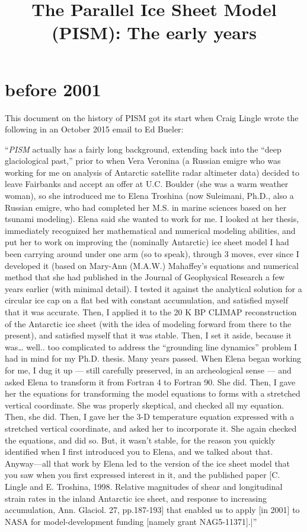 \documentclass[11pt]{article}
\begin{document}
\title{The Parallel Ice Sheet Model (PISM): The early years}
\maketitle

\section*{before 2001}

This document on the history of PISM got its start when Craig Lingle wrote the following in an October 2015 email to Ed Bueler:

``\emph{PISM} actually has a fairly long background, extending back into the “deep glaciological past,” prior to when Vera Veronina (a Russian emigre who was working for me on analysis of Antarctic satellite radar altimeter data) decided to leave Fairbanks and accept an offer at U.C. Boulder (she was a warm weather woman), so she introduced me to Elena Troshina (now Suleimani, Ph.D., also a Russian emigre, who had completed her M.S. in marine sciences based on her tsunami modeling). Elena said she wanted to work for me.
I looked at her thesis, immediately recognized her mathematical and numerical modeling abilities, and put her to work on improving the (nominally Antarctic) ice sheet model I had been carrying around under one arm (so to speak), through 3 moves, ever since I developed it (based on Mary-Ann (M.A.W.) Mahaffey’s equations and numerical method that she had published in the Journal of Geophysical Research a few years earlier (with minimal detail). I tested it against the analytical solution for a circular ice cap on a flat bed with constant accumulation, and satisfied myself that it was accurate. Then, I applied it to the 20 K BP CLIMAP reconstruction of the Antarctic ice sheet (with the idea of modeling forward from there to the present), and satisfied myself that it was stable. Then, I set it aside, because it was… well.. too complicated to address the “grounding line dynamics” problem I had in mind for my Ph.D. thesis.
Many years passed. When Elena began working for me, I dug it up — still carefully preserved, in an archeological sense — and asked Elena to transform it from Fortran 4 to Fortran 90. She did. Then, I gave her the equations for transforming the model equations to forms with a stretched vertical coordinate. She was properly skeptical, and checked all my equation. Then, she did. Then, I gave her the 3-D temperature equation expressed with a stretched vertical coordinate, and asked her to incorporate it. She again checked the equations, and did so. But, it wasn’t stable, for the reason you quickly identified when I first introduced you to Elena, and we talked about that.
Anyway---all that work by Elena led to the version of the ice sheet model that you saw when you first expressed interest in it, and the published paper [C. Lingle and E. Troshina, 1998. Relative magnitudes of shear and longitudinal strain rates in the inland Antarctic ice sheet, and response to increasing accumulation, Ann. Glaciol. 27, pp.187-193] that enabled us to apply [in 2001] to NASA for model-development funding [namely grant NAG5-11371].|''
\end{document}

